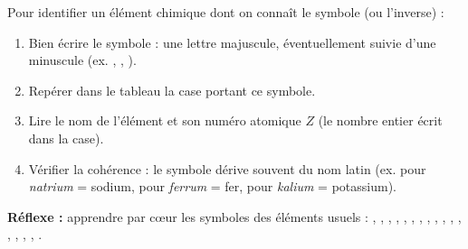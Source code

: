 \documentclass[11pt]{article}
\newcommand{\cle}[1]{{\popxbold\color{popdark}#1}}
\begin{document}
\begin{methode}
Pour identifier un élément chimique dont on connaît le symbole (ou l'inverse) :
\begin{enumerate}
\item Bien écrire le symbole : une \cle{lettre majuscule}, éventuellement suivie d'une \cle{minuscule} (ex. , , ).
\item Repérer dans le tableau la case portant ce symbole.
\item Lire le \cle{nom} de l'élément et son \cle{numéro atomique} $Z$ (le nombre entier écrit dans la case).
\item Vérifier la cohérence : le symbole dérive souvent du nom latin (ex.  pour \emph{natrium} = sodium,  pour \emph{ferrum} = fer,  pour \emph{kalium} = potassium).
\end{enumerate}
\textbf{Réflexe :} apprendre par cœur les symboles des éléments usuels : , , , , , , , , , , , , , , , , .
\end{methode}
\end{document}
